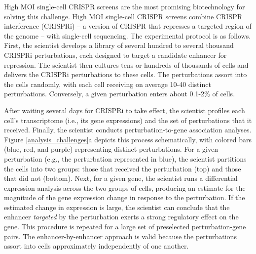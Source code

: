 \documentclass[11pt]{article}
\begin{document}
High MOI single-cell CRISPR screens are the most promising biotechnology for solving this challenge. High MOI single-cell CRISPR screens combine CRISPR interference (CRISPRi) -- a version of CRISPR that represses a targeted region of the genome -- with single-cell sequencing. The experimental protocol is as follows. First, the scientist develops a library of several hundred to several thousand CRISPRi perturbations, each designed to target a candidate enhancer for repression. The scientist then cultures tens or hundreds of thousands of cells and delivers the CRISPRi perturbations to these cells. The perturbations assort into the cells randomly, with each cell receiving on average 10-40 distinct perturbations. Conversely, a given perturbation enters about 0.1-2\% of cells. 

After waiting several days for CRISPRi to take effect, the scientist profiles each cell's transcriptome (i.e., its gene expressions) and the set of perturbations that it received. Finally, the scientist conducts perturbation-to-gene association analyses. Figure \ref{analysis_challenges}a depicts this process schematically, with colored bars (blue, red, and purple) representing distinct perturbations. For a given perturbation (e.g., the perturbation represented in blue), the scientist partitions the cells into two groups: those that received the perturbation (top) and those that did not (bottom). Next, for a given gene, the scientist runs a differential expression analysis across the two groups of cells, producing an estimate for the magnitude of the gene expression change in response to the perturbation. If the estimated change in expression is large, the scientist can conclude that the enhancer \textit{targeted} by the perturbation exerts a strong regulatory effect on the gene. This procedure is repeated for a large set of preselected perturbation-gene pairs. The enhancer-by-enhancer approach is valid because the perturbations assort into cells approximately independently of one another.
\end{document}
